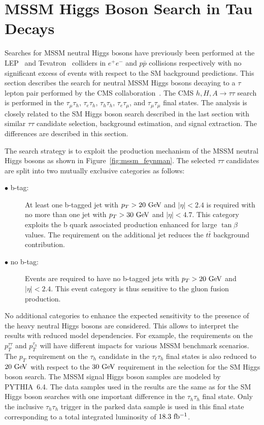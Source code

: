 \newpage
 
\section{MSSM Higgs Boson Search in Tau Decays}

Searches for MSSM neutral Higgs bosons have previously been performed at the LEP~\cite{Schael:2006cr} and Tevatron~\cite{Aaltonen:2009vf,Abazov:2010ci,Abazov:2011jh,Aaltonen:2011nh} colliders in $e^+e^-$ and $p\bar{p}$ collisions respectively with no significant excess of events with respect to the SM background predictions. This section describes the search for neutral MSSM Higgs bosons decaying to a $\tau$ lepton pair performed by the CMS collaboration~\cite{Khachatryan:2014wca}. The CMS $h,H,A\rightarrow\tau\tau$ search is performed in the $\tau_{\mu}\tau_h$, $\tau_e\tau_h$, $\tau_h\tau_h$, $\tau_e\tau_{\mu}$, and $\tau_{\mu}\tau_{\mu}$ final states.  The analysis is closely related to the SM Higgs boson search described in the last section with similar $\tau\tau$ candidate selection, background estimation, and signal extraction. The differences are described in this section.

The search strategy is to exploit the production mechanism of the MSSM neutral Higgs bosons as shown in Figure~\ref{fig:mssm_feynman}. The selected $\tau\tau$ candidates are split into two mutually exclusive categories as follows:

\begin{description}
\item[$\bullet$ b-tag:] At least one b-tagged jet with $p_T>20~\mathrm{Ge\kern -0.1em V}$ and $|\eta|<2.4$ is required with no more than one jet with $p_{T}>30~\mathrm{Ge\kern -0.1em V}$ and $|\eta|<4.7$. This category exploits the b quark associated production enhanced for large $\tan\beta$ values. The requirement on the additional jet reduces the $t\bar{t}$ background contribution.
\item[$\bullet$ no b-tag:] Events are required to have no b-tagged jets with $p_{T}>20~\mathrm{Ge\kern -0.1em V}$ and $|\eta|<2.4$. This event category is thus sensitive to the gluon fusion production.
\end{description}  

No additional categories to enhance the expected sensitivity to the presence of the heavy neutral Higgs bosons are considered. This allows to interpret the results with reduced model dependencies. For example, the requirements on the $p_{T}^{\tau\tau}$ and $p_{T}^{\tau_h}$ will have  different impacts for various MSSM benchmark scenarios.  The $p_{T}$ requirement on the $\tau_h$ candidate in the $\tau_{\ell}\tau_h$ final states is also reduced to $20~\mathrm{Ge\kern -0.1em V}$ with respect to the $30~\mathrm{Ge\kern -0.1em V}$ requirement in the selection for the SM Higgs boson search. The MSSM signal Higgs boson samples are modeled by PYTHIA~6.4. The data samples used in the results are the same as for the SM Higgs boson searches with one important difference in the $\tau_h\tau_h$ final state. Only the inclusive $\tau_h\tau_h$ trigger in the parked data sample is used in this final state corresponding to a total integrated luminosity of $18.3~\mathrm{fb^{-1}}$.   

